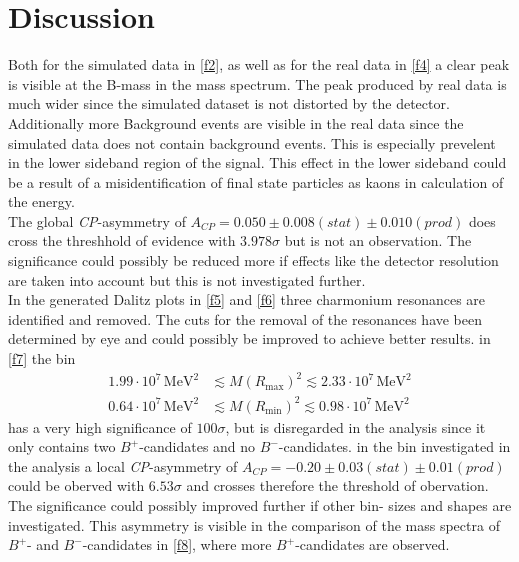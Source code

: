 \section{Discussion}
\label{sec:Diskussion}
Both for the simulated data in \autoref{f2}, as well as for the real data in \autoref{f4} a clear peak is visible at the B-mass in the
mass spectrum. The peak produced by real data is much wider since the simulated dataset is not distorted by the detector. Additionally
more Background events are visible in the real data since the simulated data does not contain background events. This is especially
prevelent in the lower sideband region of the signal. This effect in the lower sideband could be a result of a misidentification of final state
particles as kaons in calculation of the energy. \\
The global \textit{CP}-asymmetry of $A_\textit{CP} = 0.050 \pm 0.008 (stat) \pm 0.010 (prod)$ does cross the threshhold of evidence with $3.978 \sigma$
but is not an observation. The significance
could possibly be reduced more if effects like the detector resolution are taken into account but this is not investigated further. \\
In the generated Dalitz plots in \autoref{f5} and \ref{f6} three charmonium resonances are identified and removed. The cuts for the
removal of the resonances have been determined by eye and could possibly be improved to achieve better results.
in \autoref{f7} the bin
\begin{align*}
    1.99 \cdot 10^{7} \, \si{\mega\eV\squared} &\lesssim M(R_\text{max})^2 \lesssim 2.33 \cdot 10^{7} \, \si{\mega\eV\squared} \\
    0.64 \cdot 10^{7} \, \si{\mega\eV\squared} &\lesssim M(R_\text{min})^2 \lesssim 0.98 \cdot 10^{7} \, \si{\mega\eV\squared}
\end{align*}
has a very high significance of $100 \sigma$, but is disregarded in the analysis since it only contains two $B^+$-candidates and no $B^-$-candidates.
in the bin investigated in the analysis a local \textit{CP}-asymmetry of $A_\textit{CP} = -0.20 \pm 0.03(stat)  \pm 0.01(prod)$ could be oberved 
with $6.53 \sigma$ and crosses therefore the threshold of obervation. The significance could possibly improved further if other bin- sizes and shapes are
investigated. This asymmetry is visible in the comparison of the mass spectra of $B^+$- and $B^-$-candidates in \autoref{f8}, where more
$B^+$-candidates are observed.
